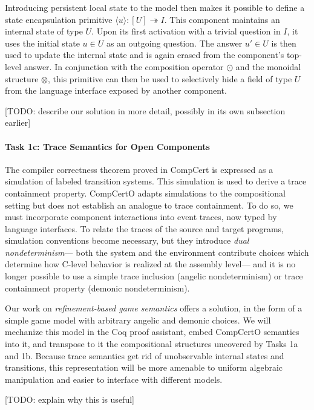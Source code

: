 Introducing persistent local state to the model
then makes it possible to define
a state encapsulation primitive $\langle u \rangle : [U] \twoheadrightarrow I$.
This component maintains an internal state of type $U$.
Upon its first activation with a trivial question in $I$,
it uses the initial state $u \in U$
as an outgoing question.
The answer $u' \in U$ is then used to update the internal state
and is again erased from the component's top-level answer.
In conjunction with
the composition operator $\odot$ and
the monoidal structure $\otimes$,
this primitive can then be used to selectively hide
a field of type $U$ from the language interface exposed
by another component.

[TODO: describe our solution in more detail,
possibly in its own subsection earlier]

\vspace*{-2ex}
\paragraph*{Task 1c: Trace Semantics for Open Components}
The compiler correctness theorem proved in CompCert
is expressed as a simulation of labeled transition systems.
This simulation is used to derive
a trace containment property.
CompCertO adapts simulations
to the compositional setting
but does not establish
an analogue to trace containment.
To do so,
we must incorporate component interactions
into event traces,
now typed by language interfaces.
To relate the traces of the source and target programs,
simulation conventions become necessary,
but they introduce
\emph{dual nondeterminism}---%
both the system and the environment contribute choices
which determine how C-level behavior is realized at the assembly level---%
and it is no longer possible to use
a simple trace inclusion (angelic nondeterminism)
or trace containment property (demonic nondeterminism).

Our work on \emph{refinement-based game semantics} \cite{koenig20}
offers a solution,
in the form of a simple game model
with arbitrary angelic and demonic choices.
We will mechanize this model in the Coq proof assistant,
embed CompCertO semantics into it,
and transpose to it the compositional structures uncovered by Tasks 1a and 1b.
Because trace semantics
get rid of unobservable internal states and transitions,
this representation will be more amenable to uniform algebraic manipulation
and easier to interface with different models.

[TODO: explain why this is useful]

